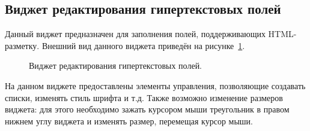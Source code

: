 \subsection{Виджет редактирования гипертекстовых полей}
\label{widget:ckeditor}
Данный виджет предназначен для заполнения полей, поддерживающих HTML-разметку. Внешний вид данного виджета приведён на рисунке~\ref{img:widget:ckeditor}.
\begin{figure}[H]
	\caption{Виджет редактирования гипертекстовых полей.}
	\label{img:widget:ckeditor}
\end{figure}
На данном виджете предоставлены элементы управления, позволяющие создавать списки, изменять стиль шрифта и т.д. Также возможно изменение размеров виджета: для этого необходимо зажать курсором мыши треугольник в правом нижнем углу виджета и изменять размер, перемещая курсор мыши.
